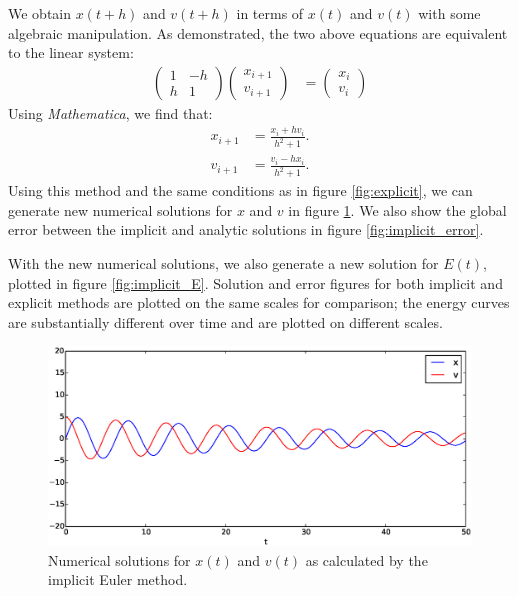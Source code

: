 \documentclass{article}
\theoremstyle{definition}
\renewcommand{\>}{\rangle}
\newcommand{\<}{\langle}
\begin{document}
We obtain $x(t+h)$ and $v(t+h)$ in terms of $x(t)$ and $v(t)$ with some algebraic
manipulation. As demonstrated, the two above equations are equivalent to the
linear system:
\begin{align*}
\left(\begin{array}{cc}
1 & -h \\
h & 1
\end{array}\right)
\left(\begin{array}{c}
x_{i+1} \\
v_{i+1}
\end{array}\right)
&=
\left(\begin{array}{c}
x_i \\
v_i
\end{array}\right)
\end{align*}
Using \emph{Mathematica}, we find that:
\begin{align*}
x_{i+1} &= \frac{x_i + hv_i}{h^2 + 1}. \\
v_{i+1} &= \frac{v_i - hx_i}{h^2 + 1}.
\end{align*}
Using this method and the same conditions as in figure \ref{fig:explicit}, we can
generate new numerical solutions for $x$ and $v$ in figure \ref{fig:implicit}.
We also show the global error between the implicit and analytic solutions
in figure \ref{fig:implicit_error}.

With the new numerical solutions, we also generate a new solution for
$E(t)$, plotted in figure \ref{fig:implicit_E}. Solution and error
figures for both implicit and explicit
methods are plotted on the same scales for comparison; the energy curves are
substantially different over time and are plotted on different scales.

\begin{figure}
\includegraphics[width=\textwidth]{implicit_Euler.eps}
\caption{\label{fig:implicit}Numerical solutions for $x(t)$ and $v(t)$ as calculated by
the implicit Euler method.}
\end{figure}
\end{document}
